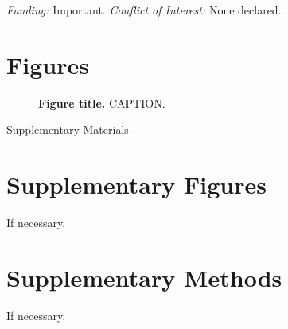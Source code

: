 \documentclass[pdftex,english,12pt]{article}
\begin{document}
\emph{Funding:} Important.
\emph{Conflict of Interest:} None declared.

\clearpage

\printbibliography[title=Bibliography]

\clearpage

\section*{Figures}

\begin{figure}[h!]
  \centering
  \caption{\textbf{Figure title.}  CAPTION.}
  \label{fig:example}
\end{figure}


{\huge Supplementary Materials}

\renewcommand{\figurename}{Supplementary Figure}
\setcounter{figure}{0}
\makeatletter
\renewcommand{\thefigure}{S\@arabic\c@figure}
\makeatother

\section*{Supplementary Figures}

If necessary.  

\section*{Supplementary Methods}

If necessary.
\end{document}
